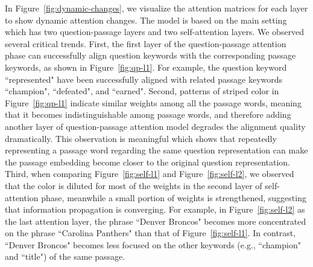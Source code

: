 \documentclass{article} \usepackage{arxiv, times}
\begin{document}
In Figure~\ref{fig:dynamic-changes}, we visualize the attention matrices for each layer to show dynamic attention changes. The model is based on the main setting which has two question-passage layers and two self-attention layers. We observed several critical trends. First, the first layer of the question-passage attention phase can successfully align question keywords with the corresponding passage keywords, as shown in Figure~\ref{fig:qp-l1}. For example, the question keyword ``represented" have been successfully aligned with related passage keywords ``champion", ``defeated", and ``earned". Second, patterns of striped color in Figure~\ref{fig:qp-l1} indicate similar weights among all the passage words, meaning that it becomes indistinguishable among passage words, and therefore adding another layer of question-passage attention model degrades the alignment quality dramatically. This observation is meaningful which shows that repeatedly representing a passage word regarding the same question representation can make the passage embedding become closer to the original question representation. Third, when comparing Figure~\ref{fig:self-l1} and Figure~\ref{fig:self-l2}, we observed that the color is diluted for most of the weights in the second layer of self-attention phase, meanwhile a small portion of weights is strengthened, suggesting that information propagation is converging. For example, in Figure~\ref{fig:self-l2} as the last attention layer, the phrase ``Denver Broncos" becomes more concentrated on the phrase ``Carolina Panthers" than that of Figure~\ref{fig:self-l1}. In contrast, ``Denver Broncos" becomes less focused on the other keywords (e.g., ``champion" and ``title") of the same passage.
\end{document}
